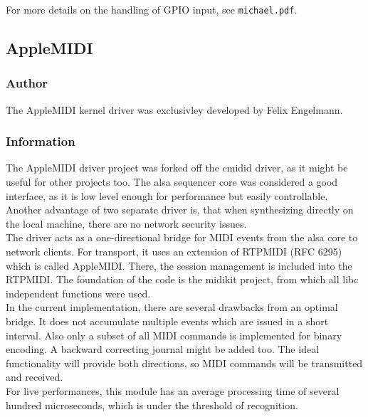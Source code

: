 \documentclass[paper=a4,fontsize=11pt,twocolumn,pagesize,bibtotoc]{scrartcl}
\begin{document}
For more details on the handling of GPIO input, see \texttt{michael.pdf}.

\subsection{AppleMIDI}
\label{overview:applemidi}

\subsubsection{Author}

The AppleMIDI kernel driver was exclusivley developed by Felix Engelmann.

\subsubsection{Information}

The AppleMIDI driver project was forked off the cmidid driver, as it might be useful for other projects too. The alsa sequencer core was considered a good interface, as it is low level enough for performance but easily controllable. Another advantage of two separate driver is, that when synthesizing directly on the local machine, there are no network security issues.
\\
The driver acts as a one-directional bridge for MIDI events from the alsa core to network clients.
For transport, it uses an extension of RTPMIDI (RFC 6295) which is called AppleMIDI. There, the session management is included into the RTPMIDI.
The foundation of the code is the midikit project, from which all libc independent functions were used.
\\
In the current implementation, there are several drawbacks from an optimal bridge. It does not accumulate multiple events which are issued in a short interval. Also only a subset of all MIDI commands is implemented for binary encoding. A backward correcting journal might be added too. The ideal functionality will provide both directions, so MIDI commands will be transmitted and received.
\\
For live performances, this module has an average processing time of several hundred microseconds, which is under the threshold of recognition.
\end{document}
